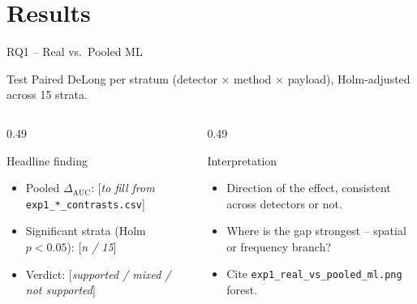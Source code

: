 \documentclass[aspectratio=169,11pt]{beamer}
\begin{document}
\section{Results}
\begin{frame}{RQ1 -- Real vs.\ Pooled ML}
\small
\begin{block}{Test}
Paired DeLong per stratum (detector $\times$ method $\times$ payload), Holm-adjusted across 15 strata.
\end{block}
\begin{columns}[T]
\begin{column}{0.49\textwidth}
\begin{block}{Headline finding}
\begin{itemize}
\item Pooled $\Delta_\text{AUC}$: [\textit{to fill from} \texttt{exp1\_*\_contrasts.csv}]
\item Significant strata (Holm $p\!<\!0.05$): [\textit{n / 15}]
\item Verdict: [\textit{supported / mixed / not supported}]
\end{itemize}
\end{block}
\end{column}
\begin{column}{0.49\textwidth}
\begin{block}{Interpretation}
\begin{itemize}
\item Direction of the effect, consistent across detectors or not.
\item Where is the gap strongest -- spatial or frequency branch?
\item Cite \texttt{exp1\_real\_vs\_pooled\_ml.png} forest.
\end{itemize}
\end{block}
\end{column}
\end{columns}
\end{frame}
\end{document}
